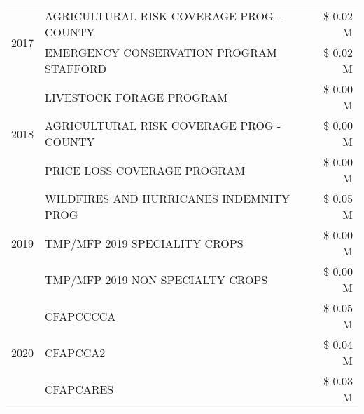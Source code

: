 \begin{tabular}{llr}
\cline{1-3}
\multirow[t]{2}{*}{2017} & AGRICULTURAL RISK COVERAGE PROG - COUNTY & \$ 0.02 M \\
 & EMERGENCY CONSERVATION PROGRAM STAFFORD & \$ 0.02 M \\
\cline{1-3}
\multirow[t]{3}{*}{2018} & LIVESTOCK FORAGE PROGRAM & \$ 0.00 M \\
 & AGRICULTURAL RISK COVERAGE PROG - COUNTY & \$ 0.00 M \\
 & PRICE LOSS COVERAGE PROGRAM & \$ 0.00 M \\
\cline{1-3}
\multirow[t]{3}{*}{2019} & WILDFIRES AND HURRICANES INDEMNITY PROG & \$ 0.05 M \\
 & TMP/MFP 2019 SPECIALITY CROPS & \$ 0.00 M \\
 & TMP/MFP 2019 NON SPECIALTY CROPS & \$ 0.00 M \\
\cline{1-3}
\multirow[t]{3}{*}{2020} & CFAPCCCCA & \$ 0.05 M \\
 & CFAPCCA2 & \$ 0.04 M \\
 & CFAPCARES & \$ 0.03 M \\
\cline{1-3}
\bottomrule
\end{tabular}
